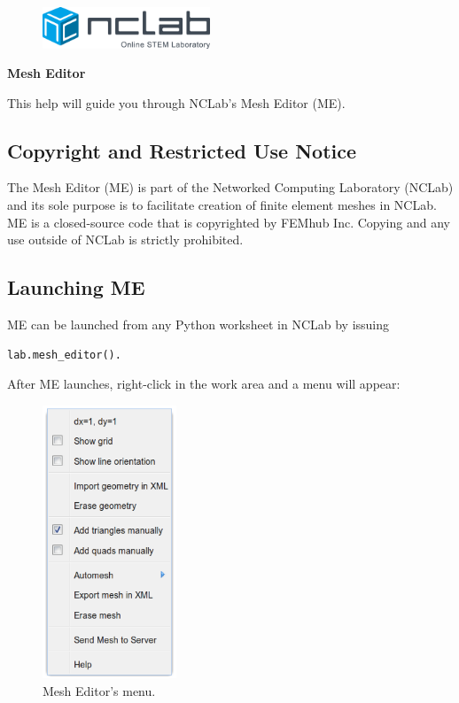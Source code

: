 \documentclass{article}
\begin{document}
\large

\vbox{}
\begin{figure}[!ht]
\includegraphics[width=5cm]{logo.png}
\vspace{4mm}
\end{figure}

\centerline{\huge \bf Mesh Editor}
\vspace{6mm}
\noindent
This help will guide you through NCLab's Mesh Editor (ME).

\subsection*{Copyright and Restricted Use Notice}

The Mesh Editor (ME) is part of the Networked Computing Laboratory (NCLab) and its sole 
purpose is to facilitate creation of finite element meshes in NCLab. ME is a closed-source 
code that is copyrighted by FEMhub Inc. Copying and any use outside of NCLab is strictly 
prohibited.

\subsection*{Launching ME}

ME can be launched from any Python worksheet in NCLab by issuing 

\begin{verbatim}
lab.mesh_editor().
\end{verbatim}
After ME launches, right-click in the work area and a menu will appear:\\

\begin{figure}[!ht]
\begin{center}
\includegraphics[width=4cm]{me-menu.png}
\end{center}
\vspace{-4mm}
\caption{Mesh Editor's menu.}
\end{figure}
\end{document}
